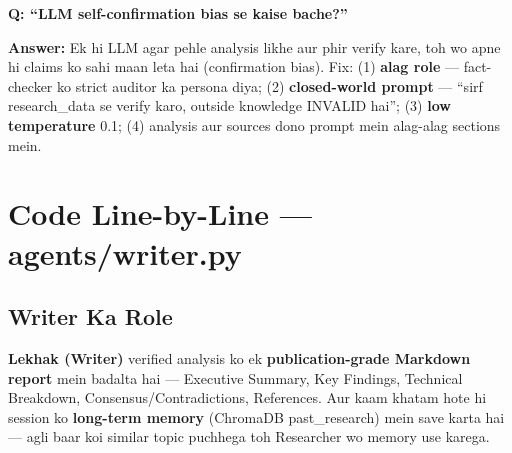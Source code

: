 \documentclass[11pt, a4paper]{article}
\begin{document}
\begin{interviewbox}
\textbf{Q: ``LLM self-confirmation bias se kaise bache?''}

\textbf{Answer:} Ek hi LLM agar pehle analysis likhe aur phir verify kare, toh wo apne hi claims ko sahi maan leta hai (confirmation bias). Fix: (1) \textbf{alag role} --- fact-checker ko strict auditor ka persona diya; (2) \textbf{closed-world prompt} --- ``sirf research\_data se verify karo, outside knowledge INVALID hai''; (3) \textbf{low temperature} 0.1; (4) analysis aur sources dono prompt mein alag-alag sections mein.
\end{interviewbox}

\section{Code Line-by-Line --- agents/writer.py}

\subsection{Writer Ka Role}

\begin{storybox}
\textbf{Lekhak (Writer)} verified analysis ko ek \textbf{publication-grade Markdown report} mein badalta hai --- Executive Summary, Key Findings, Technical Breakdown, Consensus/Contradictions, References. Aur kaam khatam hote hi session ko \textbf{long-term memory} (ChromaDB past\_research) mein save karta hai --- agli baar koi similar topic puchhega toh Researcher wo memory use karega.
\end{storybox}
\end{document}
